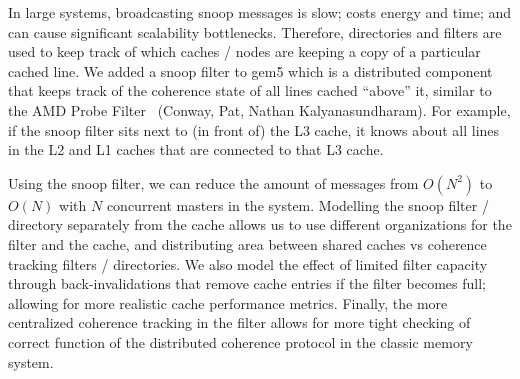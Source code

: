 In large systems, broadcasting snoop messages is slow; costs energy and time; and can cause significant scalability bottlenecks.
Therefore, directories and filters are used to keep track of which caches / nodes are keeping a copy of a particular cached line.
We added a snoop filter to gem5 which is a distributed component that keeps track of the coherence state of all lines cached “above” it, similar to the AMD Probe Filter~\cite{} (Conway, Pat, Nathan Kalyanasundharam).
For example, if the snoop filter sits next to (in front of) the L3 cache, it knows about all lines in the L2 and L1 caches that are connected to that L3 cache.

Using the snoop filter, we can reduce the amount of messages from $O(N^2)$ to $O(N)$ with $N$ concurrent masters in the system.
Modelling the snoop filter / directory separately from the cache allows us to use different organizations for the filter and the cache, and distributing area between shared caches vs coherence tracking filters / directories.
We also model the effect of limited filter capacity through back-invalidations that remove cache entries if the filter becomes full; allowing for more realistic cache performance metrics.
Finally, the more centralized coherence tracking in the filter allows for more tight checking of correct function of the distributed coherence protocol in the classic memory system.
